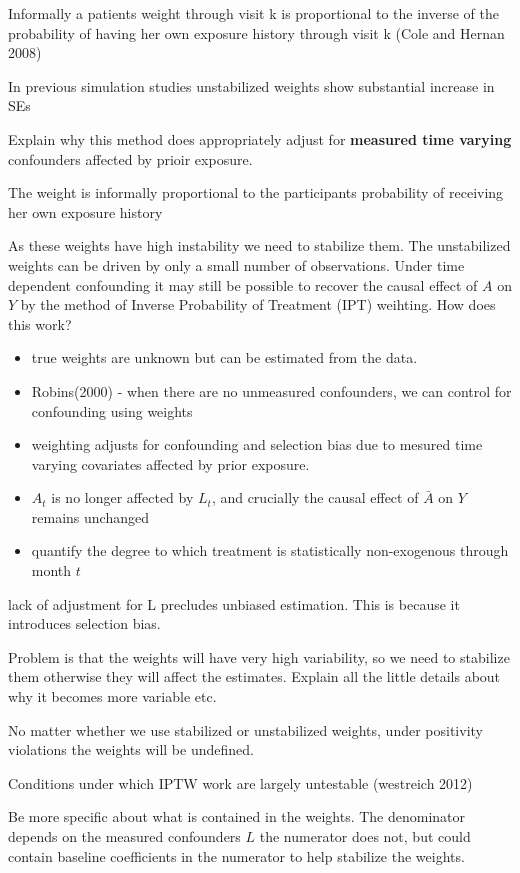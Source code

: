 \documentclass[11pt]{article}
\providecommand{\tightlist}{%
      \setlength{\itemsep}{0pt}\setlength{\parskip}{0pt}}
\begin{document}
Informally a patients weight through visit k is proportional to the
inverse of the probability of having her own exposure history through
visit k (Cole and Hernan 2008)

In previous simulation studies unstabilized weights show substantial
increase in SEs

Explain why this method does appropriately adjust for \textbf{measured
time varying} confounders affected by prioir exposure.

The weight is informally proportional to the participants probability of
receiving her own exposure history

As these weights have high instability we need to stabilize them. The
unstabilized weights can be driven by only a small number of
observations. Under time dependent confounding it may still be possible
to recover the causal effect of \(A\) on \(Y\) by the method of Inverse
Probability of Treatment (IPT) weihting. How does this work?

\begin{itemize}
\tightlist
\item
  true weights are unknown but can be estimated from the data.
\item
  Robins(2000) - when there are no unmeasured confounders, we can
  control for confounding using weights
\item
  weighting adjusts for confounding and selection bias due to mesured
  time varying covariates affected by prior exposure.
\item
  \(A_t\) is no longer affected by \(L_t\), and crucially the causal
  effect of \(\bar A\) on \(Y\) remains unchanged
\item
  quantify the degree to which treatment is statistically non-exogenous
  through month \(t\)
\end{itemize}

lack of adjustment for L precludes unbiased estimation. This is because
it introduces selection bias.

Problem is that the weights will have very high variability, so we need
to stabilize them otherwise they will affect the estimates. Explain all
the little details about why it becomes more variable etc.

No matter whether we use stabilized or unstabilized weights, under
positivity violations the weights will be undefined.

Conditions under which IPTW work are largely untestable (westreich 2012)

Be more specific about what is contained in the weights. The denominator
depends on the measured confounders \(L\) the numerator does not, but
could contain baseline coefficients in the numerator to help stabilize
the weights.
\end{document}
